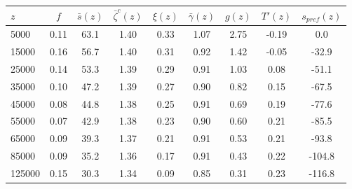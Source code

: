 \begin{tabular}{lcccccccc}
\hline
\hline
$z$ & $f$ & $\bar s(z)$ & $\bar\zeta^c(z)$ & $\xi(z)$ & $\bar\gamma(z)$ & $g(z)$ & $T'(z)$ & $s_{pref}(z)$ \\
\hline
5000 & 0.11 & 63.1 & 1.40 & 0.33 & 1.07 & 2.75 & -0.19 & 0.0 \\
15000 & 0.16 & 56.7 & 1.40 & 0.31 & 0.92 & 1.42 & -0.05 & -32.9 \\
25000 & 0.14 & 53.3 & 1.39 & 0.29 & 0.91 & 1.03 & 0.08 & -51.1 \\
35000 & 0.10 & 47.2 & 1.39 & 0.27 & 0.90 & 0.82 & 0.15 & -67.5 \\
45000 & 0.08 & 44.8 & 1.38 & 0.25 & 0.91 & 0.69 & 0.19 & -77.6 \\
55000 & 0.07 & 42.9 & 1.38 & 0.23 & 0.90 & 0.60 & 0.21 & -85.5 \\
65000 & 0.09 & 39.3 & 1.37 & 0.21 & 0.91 & 0.53 & 0.21 & -93.8 \\
85000 & 0.09 & 35.2 & 1.36 & 0.17 & 0.91 & 0.43 & 0.22 & -104.8 \\
125000 & 0.15 & 30.3 & 1.34 & 0.09 & 0.85 & 0.31 & 0.23 & -116.8 \\
\hline
\hline
\end{tabular}
